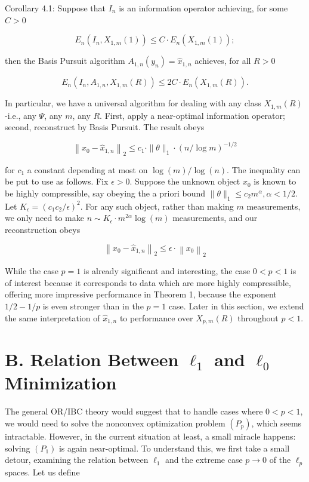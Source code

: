 \documentclass[10pt]{article}
\begin{document}
Corollary 4.1: Suppose that $I_{n}$ is an information operator achieving, for some $C>0$

$$
E_{n}\left(I_{n}, X_{1, m}(1)\right) \leq C \cdot E_{n}\left(X_{1, m}(1)\right) ;
$$

then the Basis Pursuit algorithm $A_{1, n}\left(y_{n}\right)=\hat{x}_{1, n}$ achieves, for all $R>0$

$$
E_{n}\left(I_{n}, A_{1, n}, X_{1, m}(R)\right) \leq 2 C \cdot E_{n}\left(X_{1, m}(R)\right) .
$$

In particular, we have a universal algorithm for dealing with any class $X_{1, m}(R)$-i.e., any $\Psi$, any $m$, any $R$. First, apply a near-optimal information operator; second, reconstruct by Basis Pursuit. The result obeys

$$
\left\|x_{0}-\hat{x}_{1, n}\right\|_{2} \leq c_{1} \cdot\|\theta\|_{1} \cdot(n / \log m)^{-1 / 2}
$$

for $c_{1}$ a constant depending at most on $\log (m) / \log (n)$. The inequality can be put to use as follows. Fix $\epsilon>0$. Suppose the unknown object $x_{0}$ is known to be highly compressible, say obeying the a priori bound $\|\theta\|_{1} \leq c_{2} m^{\alpha}, \alpha<1 / 2$. Let $K_{\epsilon}=\left(c_{1} c_{2} / \epsilon\right)^{2}$. For any such object, rather than making $m$ measurements, we only need to make $n \sim K_{\epsilon} \cdot m^{2 \alpha} \log (m)$ measurements, and our reconstruction obeys

$$
\left\|x_{0}-\hat{x}_{1, n}\right\|_{2} \leq \epsilon \cdot\left\|x_{0}\right\|_{2}
$$

While the case $p=1$ is already significant and interesting, the case $0<p<1$ is of interest because it corresponds to data which are more highly compressible, offering more impressive performance in Theorem 1, because the exponent $1 / 2-1 / p$ is even stronger than in the $p=1$ case. Later in this section, we extend the same interpretation of $\hat{x}_{1, n}$ to performance over $X_{p, m}(R)$ throughout $p<1$.

\section*{B. Relation Between $\ell_{1}$ and $\ell_{0}$ Minimization}
The general OR/IBC theory would suggest that to handle cases where $0<p<1$, we would need to solve the nonconvex optimization problem $\left(P_{p}\right)$, which seems intractable. However, in the current situation at least, a small miracle happens: solving $\left(P_{1}\right)$ is again near-optimal. To understand this, we first take a small detour, examining the relation between $\ell_{1}$ and the extreme case $p \rightarrow 0$ of the $\ell_{p}$ spaces. Let us define
\end{document}
